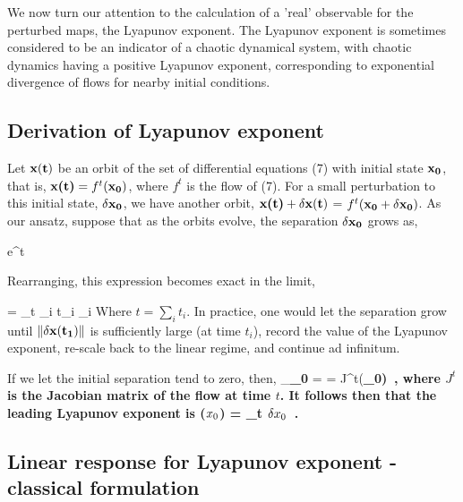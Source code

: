\documentclass[aps,pre,
                showpacs,
                twocolumn,
                groupedaddress,
                superscriptaddress,
                floatfix]{revtex4-1}
\begin{document}
We now turn our attention to the calculation of a 'real' observable for
the perturbed maps, the Lyapunov exponent. The Lyapunov exponent is
sometimes considered to be an indicator of a chaotic dynamical system,
with chaotic dynamics having a positive Lyapunov exponent, corresponding
to exponential divergence of flows for nearby initial conditions.

\subsection{Derivation of Lyapunov exponent}

Let $\bf x(t)$ be an orbit of the set of differential equations (7) with
initial state $\bf x_{0}$, that is, $\textbf{x(t)} = f^{t}(\textbf{$\bf
x_0$})$, where $f^t$ is the flow of (7). For a small perturbation to this
initial state, $\bf \delta x_{0}$, we have another orbit, $\textbf{x(t)}
+ \textbf{$\bf \delta x(t)$}$ = $f^{t}(\textbf{$\bf x_{0}$} +
\textbf{$\bf \delta x_{0}$})$. As our ansatz, suppose that as the orbits
evolve, the separation $\bf \delta x_{0}$ grows as,

\beq
e^{\lambda t} \approx \left\Vert {} \right\Vert
\eeq

Rearranging, this expression becomes exact in the limit,

\beq
\lambda = \lim_{t\rightarrow \infty}  \sum_{i} t_{i} \lambda_{i}
\eeq
Where $t = \sum_{i} t_{i}$. In practice, one would let the separation
grow until $\Vert \bf \delta x(t_{1}) \Vert$ is sufficiently large (at
time $t_{i}$), record the value of the Lyapunov exponent, re-scale back
to the linear regime, and continue ad infinitum.

If we let the initial separation tend to zero, then,
\beq
\lim_{\bf \delta \ssp_{0} } 
= 
= J^{t}(\bf \ssp_{0})
\,,
\eeq
where $J^{t}$ is the Jacobian matrix of the flow at time $t$. It follows
then that the leading Lyapunov exponent is
\beq
\lambda(\textbf{$\ssp_{0}$})
= \lim_{t\rightarrow \infty}
\ln {}
         {\Vert \textbf{$\delta \ssp_{0}$} \Vert}
\,.
\eeq

\subsection{Linear response for Lyapunov exponent - classical formulation}
\label{sect:LinrespLyapClass}
\end{document}
